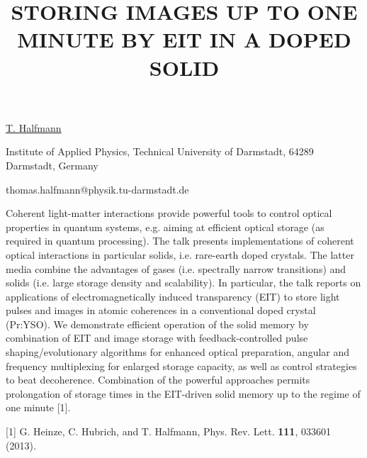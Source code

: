 \title{STORING IMAGES UP TO ONE MINUTE BY EIT IN A DOPED SOLID}

\underline{T. Halfmann} 

{\normalsize{\vspace{-4mm}
Institute of Applied Physics, Technical University of Darmstadt,
64289 Darmstadt, Germany

\email thomas.halfmann@physik.tu-darmstadt.de}}

Coherent light-matter interactions provide powerful tools to control optical properties in quantum systems, e.g. aiming at efficient optical storage (as required in quantum processing). The talk presents implementations of coherent optical interactions in particular solids, i.e. rare-earth doped crystals. The latter media combine the advantages of gases (i.e. spectrally narrow transitions) and solids (i.e. large storage density and scalability). In particular, the talk reports on applications of electromagnetically induced transparency (EIT) to store light pulses and images in atomic coherences in a conventional doped crystal (Pr:YSO). We demonstrate efficient operation of the solid memory by combination of EIT and image storage with feedback-controlled pulse shaping/evolutionary algorithms for enhanced optical preparation, angular and frequency multiplexing for enlarged storage capacity, as well as control strategies to beat decoherence. Combination of the powerful approaches permits prolongation of storage times in the EIT-driven solid memory up to the regime of one minute [1].

{\normalsize
[1] G. Heinze, C. Hubrich, and T. Halfmann, Phys. Rev. Lett. \textbf{111}, 033601 (2013).
}

\vspace{\baselineskip}
